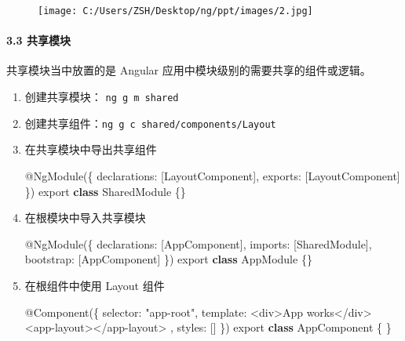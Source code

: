 \documentclass[
]{article}
\newenvironment{Shaded}{}{}
\newcommand{\DataTypeTok}[1]{\textcolor[rgb]{0.56,0.13,0.00}{#1}}
\newcommand{\FunctionTok}[1]{\textcolor[rgb]{0.02,0.16,0.49}{#1}}
\newcommand{\ImportTok}[1]{#1}
\newcommand{\KeywordTok}[1]{\textcolor[rgb]{0.00,0.44,0.13}{\textbf{#1}}}
\newcommand{\NormalTok}[1]{#1}
\newcommand{\OperatorTok}[1]{\textcolor[rgb]{0.40,0.40,0.40}{#1}}
\newcommand{\StringTok}[1]{\textcolor[rgb]{0.25,0.44,0.63}{#1}}
\newcommand{\VerbatimStringTok}[1]{\textcolor[rgb]{0.25,0.44,0.63}{#1}}
\begin{document}
\begin{figure}
\centering
\texttt{[image: C:/Users/ZSH/Desktop/ng/ppt/images/2.jpg]}
\caption{}
\end{figure}

\hypertarget{33-ux5171ux4eabux6a21ux5757}{%
\paragraph{3.3 共享模块}\label{33-ux5171ux4eabux6a21ux5757}}

共享模块当中放置的是 Angular 应用中模块级别的需要共享的组件或逻辑。

\begin{enumerate}
\def\labelenumi{\arabic{enumi}.}
\item
  创建共享模块： \texttt{ng\ g\ m\ shared}
\item
  创建共享组件：\texttt{ng\ g\ c\ shared/components/Layout}
\item
  在共享模块中导出共享组件

\begin{Shaded}
\begin{Highlighting}[]
\NormalTok{@}\FunctionTok{NgModule}\NormalTok{(\{}
  \DataTypeTok{declarations}\OperatorTok{:}\NormalTok{ [LayoutComponent]}\OperatorTok{,}
  \DataTypeTok{exports}\OperatorTok{:}\NormalTok{ [LayoutComponent]}
\NormalTok{\})}
\ImportTok{export} \KeywordTok{class}\NormalTok{ SharedModule \{\}}
\end{Highlighting}
\end{Shaded}
\item
  在根模块中导入共享模块

\begin{Shaded}
\begin{Highlighting}[]
\NormalTok{@}\FunctionTok{NgModule}\NormalTok{(\{}
  \DataTypeTok{declarations}\OperatorTok{:}\NormalTok{ [AppComponent]}\OperatorTok{,}
  \DataTypeTok{imports}\OperatorTok{:}\NormalTok{ [SharedModule]}\OperatorTok{,}
  \DataTypeTok{bootstrap}\OperatorTok{:}\NormalTok{ [AppComponent]}
\NormalTok{\})}
\ImportTok{export} \KeywordTok{class}\NormalTok{ AppModule \{\}}
\end{Highlighting}
\end{Shaded}
\item
  在根组件中使用 Layout 组件

\begin{Shaded}
\begin{Highlighting}[]
\NormalTok{@}\FunctionTok{Component}\NormalTok{(\{}
  \DataTypeTok{selector}\OperatorTok{:} \StringTok{"app{-}root"}\OperatorTok{,}
  \DataTypeTok{template}\OperatorTok{:} \VerbatimStringTok{\textasciigrave{}}
\VerbatimStringTok{    \textless{}div\textgreater{}App works\textless{}/div\textgreater{}}
\VerbatimStringTok{    \textless{}app{-}layout\textgreater{}\textless{}/app{-}layout\textgreater{}}
\VerbatimStringTok{  \textasciigrave{}}\OperatorTok{,}
  \DataTypeTok{styles}\OperatorTok{:}\NormalTok{ []}
\NormalTok{\})}
\ImportTok{export} \KeywordTok{class}\NormalTok{ AppComponent \{ \}}
\end{Highlighting}
\end{Shaded}
\end{enumerate}
\end{document}
